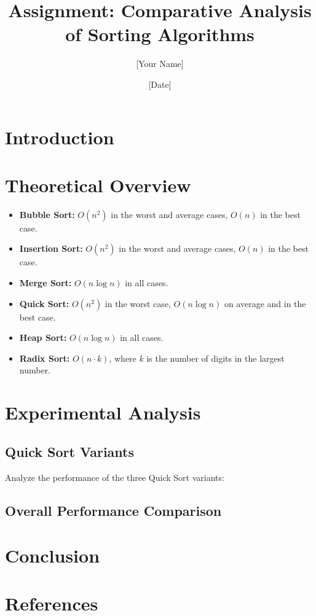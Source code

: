 \documentclass[12pt]{article}
\title{Assignment: Comparative Analysis of Sorting Algorithms}
\author{[Your Name]}
\date{[Date]}
\begin{document}
\maketitle

\tableofcontents

\newpage

\section{Introduction}


\section{Theoretical Overview}


\begin{itemize}
    \item \textbf{Bubble Sort:} \(O(n^2)\) in the worst and average cases, \(O(n)\) in the best case.
    \item \textbf{Insertion Sort:} \(O(n^2)\) in the worst and average cases, \(O(n)\) in the best case.
    \item \textbf{Merge Sort:} \(O(n \log n)\) in all cases.
    \item \textbf{Quick Sort:} \(O(n^2)\) in the worst case, \(O(n \log n)\) on average and in the best case.
    \item \textbf{Heap Sort:} \(O(n \log n)\) in all cases.
    \item \textbf{Radix Sort:} \(O(n \cdot k)\), where \(k\) is the number of digits in the largest number.
\end{itemize}

\section{Experimental Analysis}



\subsection{Quick Sort Variants}
Analyze the performance of the three Quick Sort variants:


\subsection{Overall Performance Comparison}


\section{Conclusion}


\section{References}
\end{document}
